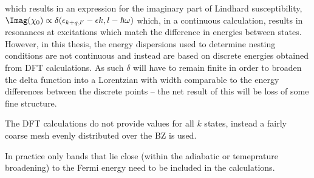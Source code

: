  which results in an expression for the imaginary part of Lindhard susceptibility, $\Imag(\chi_0)\propto \delta(\epsilon_{k+q,l^\prime} - \epsilon{k,l} - \hbar\omega)$ which, in a continuous calculation, results in resonances at excitations which match the difference in energies between states. However, in this thesis, the energy dispersions used to determine nesting conditions are not continuous and instead are based on discrete energies obtained from DFT calculations. As such $\delta$ will have to remain finite in order to broaden the delta function into a Lorentzian with width comparable to the energy differences between the discrete points -- the net result of this will be loss of some fine structure.

The DFT calculations do not provide values for all $k$ states, instead a fairly coarse mesh evenly distributed over the \ac{BZ} is used. 

In practice only bands that lie close (within the adiabatic or temeprature broadening) to the Fermi energy need to be included in the calculations.
